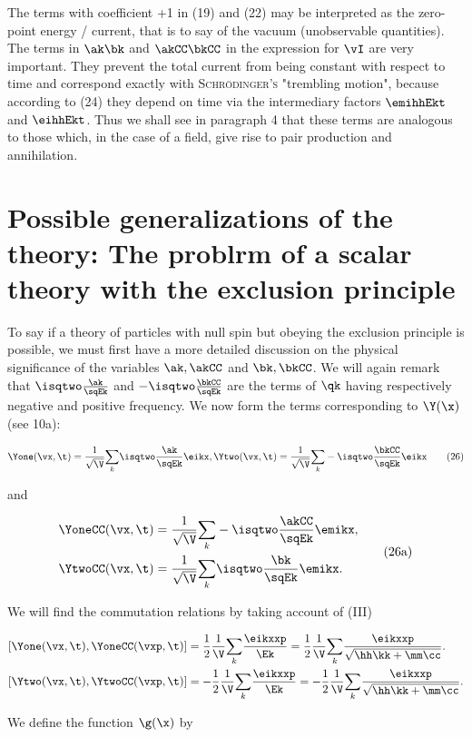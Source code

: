 \documentclass{article}
\newcommand{\inv}[1]{\frac{1}{#1}}
\newcommand{\commutator}[2]{\left[ #1, #2 \right]}
\newcommand{\isqEk}[1]{\frac{#1}{\sqEk}}
\newcommand{\sqV}{\sqrt{\V}}
\newcommand{\isqV}{\inv{\sqV}}
\renewcommand{\sc}[1]{\textsc{#1}}
\newcommand{\sumk}{\underset{k}{\sum}}
\newcommand{\nequ}[2]{
\begin{equation*}
#1
\tag{#2}
\end{equation*}
}
\newcommand{\uequ}[1]{
\begin{equation*}
#1
\end{equation*}
}
\begin{document}
The terms with coefficient +1 in (19) and (22) may be interpreted as the zero-point energy / current, that is to say of the vacuum (unobservable quantities). The terms in $\ak\bk$ and $\akCC\bkCC$ in the expression for $\vI$ are very important. They prevent the total current from being constant with respect to time and correspond exactly with \sc{Schrödinger's} "trembling motion", because according to (24) they depend on time via the intermediary factors $\emihhEkt$ and $\eihhEkt$. Thus we shall see in paragraph 4 that these terms are analogous to those which, in the case of a field, give rise to pair production and annihilation.

\section{Possible generalizations of the theory: The problrm of a scalar theory with the exclusion principle}

To say if a theory of particles with null spin but obeying the exclusion principle is possible, we must first have a more detailed discussion on the physical significance of the variables $\ak, \akCC$ and $\bk, \bkCC$. We will again remark that $\isqtwo\isqEk{\ak}$ and $-\isqtwo\isqEk{\bkCC}$ are the terms of $\qk$ having respectively negative and positive frequency.
We now form the terms corresponding to $\Y(\x)$ (see 10a):

\nequ{
\Yone(\vx, \t) = \isqV\sumk\isqtwo\isqEk{\ak}\eikx,
\Ytwo(\vx, \t) = \isqV\sumk-\isqtwo\isqEk{\bkCC}\eikx
}{26}

and

\nequ{
\begin{split}
\YoneCC(\vx, \t) &= \isqV\sumk-\isqtwo\isqEk{\akCC}\emikx,\\
\YtwoCC(\vx, \t) &= \isqV\sumk\isqtwo\isqEk{\bk}\emikx.
\end{split}
}{26a}

We will find the commutation relations by taking account of (III)

\uequ{
\begin{split}
\commutator{\Yone(\vx, \t)}{\YoneCC(\vxp, \t)}
&= \inv{2}\inv{\V}\sumk\frac{\eikxxp}{\Ek}
 = \inv{2}\inv{\V}\sumk\frac{\eikxxp}{\sqrt{\hh\kk + \mm\cc}}. \\
\commutator{\Ytwo(\vx, \t)}{\YtwoCC(\vxp, \t)}
&= -\inv{2}\inv{\V}\sumk\frac{\eikxxp}{\Ek}
 = -\inv{2}\inv{\V}\sumk\frac{\eikxxp}{\sqrt{\hh\kk + \mm\cc}}.
\end{split}
}

We define the function $\g(\x)$ by
\end{document}
